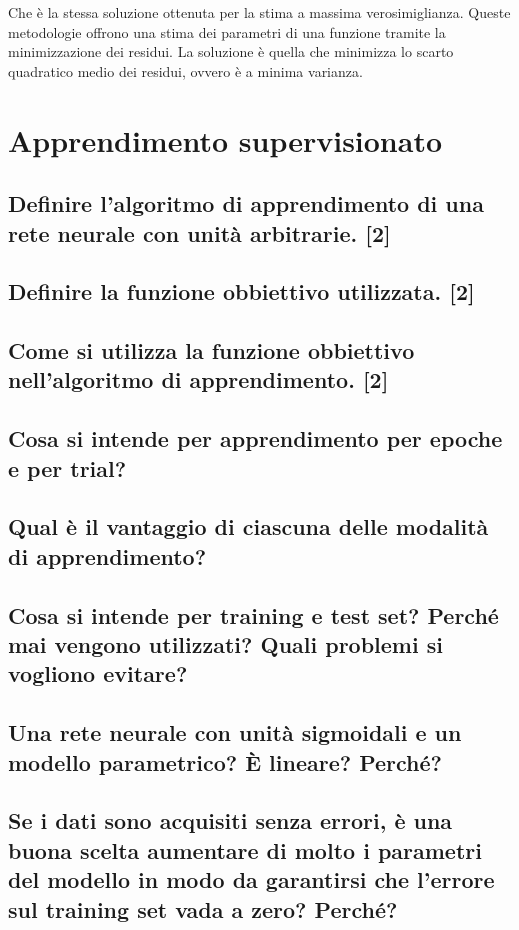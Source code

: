 \documentclass[\main/main.tex]{subfiles}
\begin{document}
Che è la stessa soluzione ottenuta per la stima a massima verosimiglianza. Queste metodologie offrono una stima dei parametri di una funzione tramite la minimizzazione dei residui.
La soluzione è quella che minimizza lo scarto quadratico medio dei residui, ovvero è a minima varianza.

\clearpage
\section{Apprendimento supervisionato}

\subsection{Definire l'algoritmo di apprendimento di una rete neurale con unità arbitrarie. [2]}
\subsection{Definire la funzione obbiettivo utilizzata. [2]}
\subsection{Come si utilizza la funzione obbiettivo nell'algoritmo di apprendimento. [2]}
\subsection{Cosa si intende per apprendimento per epoche e per trial?}
\subsection{Qual è il vantaggio di ciascuna delle modalità di apprendimento?}
\subsection{Cosa si intende per training e test set? Perché mai vengono utilizzati? Quali problemi si vogliono evitare?}
\subsection{Una rete neurale con unità sigmoidali e un modello parametrico? È lineare? Perché?}
\subsection{Se i dati sono acquisiti senza errori, è una buona scelta aumentare di molto i parametri del modello in modo da garantirsi che l'errore sul training set vada a zero? Perché?}
\end{document}
